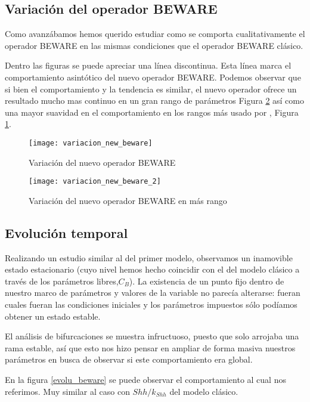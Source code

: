 \subsection{Variación del operador BEWARE}
Como avanzábamos hemos querido estudiar como se comporta cualitativamente el operador BEWARE en las mismas condiciones que el operador BEWARE clásico.

Dentro las figuras se puede apreciar una línea discontinua. Esta línea marca el comportamiento asintótico del nuevo operador BEWARE.
 Podemos observar que si bien el comportamiento y la tendencia es similar, el nuevo operador ofrece un resultado mucho mas continuo en un gran rango de parámetros Figura \ref{vari_beware_2} así como una mayor suavidad en el comportamiento en los rangos más usado por \cite{schaffer}, Figura \ref{vari_beware}. 
\begin{figure}[h]
	\texttt{[image: variacion\_new\_beware]}
	\centering
	\caption{Variación del nuevo operador BEWARE }
	\label{vari_beware}
\end{figure}

\begin{figure}[h]
	\texttt{[image: variacion\_new\_beware\_2]}
	\centering
	\caption{Variación del nuevo operador BEWARE en más rango}
	\label{vari_beware_2}
\end{figure}

\subsection{Evolución temporal}

Realizando un estudio similar al del primer modelo, observamos un inamovible estado estacionario (cuyo nivel hemos hecho coincidir con el del modelo clásico a través de los parámetros libres,$C_B$). La existencia de un punto fijo dentro de nuestro marco de parámetros y valores de la variable no parecía alterarse: fueran cuales fueran las condiciones iniciales y los parámetros impuestos sólo podíamos obtener un estado estable. 

El análisis de bifurcaciones se muestra infructuoso, puesto que solo arrojaba una rama estable, así que esto nos hizo pensar en ampliar de forma masiva nuestros parámetros en busca de observar si este comportamiento era global.
 
 En la figura \ref{evolu_beware} se puede observar el comportamiento al cual nos referimos. Muy similar al caso con $Shh/k_{Shh}$ del modelo clásico.

